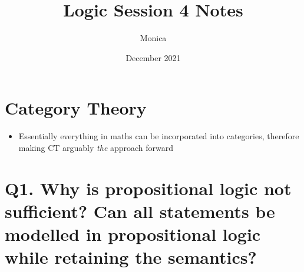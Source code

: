 \documentclass{article}
\title{Logic Session 4 Notes}
\author{Monica}
\date{December 2021}
\begin{document}
\maketitle

\section*{Category Theory}
\begin{itemize}
  \item Essentially everything in maths can be incorporated into categories, therefore making CT arguably \emph{the} approach forward
\end{itemize}

\section*{Q1. Why is propositional logic not sufficient? Can all statements be modelled in propositional logic while retaining the semantics?}
\end{document}
